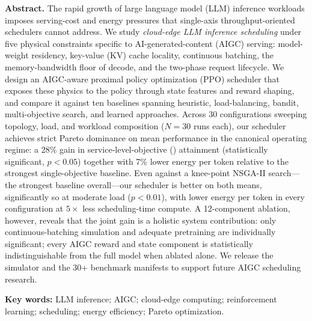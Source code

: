 \noindent\textbf{Abstract.} The rapid growth of large language
model (LLM) inference workloads
imposes serving-cost and energy pressures that single-axis
throughput-oriented schedulers cannot address. We study
\emph{cloud-edge LLM inference scheduling} under five
physical constraints specific to AI-generated-content (AIGC)
serving: model-weight residency,
key-value (KV) cache locality, continuous batching, the
memory-bandwidth floor of decode, and the two-phase
request lifecycle. We design an AIGC-aware
proximal policy optimization (PPO) scheduler that exposes these
physics to the policy through state features and reward
shaping, and compare it against ten baselines spanning
heuristic, load-balancing, bandit, multi-objective search,
and learned approaches.
Across 30 configurations sweeping topology, load, and workload
composition ($N{=}30$ runs each), our scheduler achieves
strict Pareto dominance on mean performance in the canonical
operating regime: a
28\% gain in service-level-objective (\slo) attainment
(statistically significant,
$p<0.05$) together with 7\% lower energy per token relative to
the strongest single-objective baseline. Even against a
knee-point NSGA-II search---the strongest baseline
overall---our scheduler is better on both means,
significantly so at moderate load ($p<0.01$), with lower
energy per token in every configuration at $5\times$ less
scheduling-time compute. A 12-component ablation,
however, reveals that the joint gain is a holistic system
contribution: only continuous-batching simulation and adequate
pretraining are individually significant; every AIGC reward and
state component is statistically indistinguishable from the full
model when ablated alone. We release the simulator and the 30+
benchmark manifests to support future AIGC scheduling research.

\noindent\textbf{Key words:} LLM inference; AIGC; cloud-edge
computing; reinforcement learning; scheduling; energy
efficiency; Pareto optimization.
